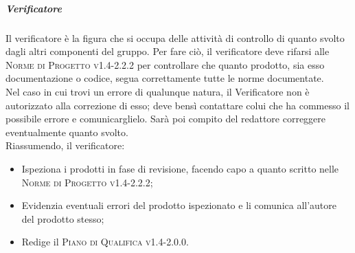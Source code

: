 \documentclass[../norme-di-progetto.tex]{subfiles}
\begin{document}
\subparagraph{Verificatore}
Il verificatore è la figura che si occupa delle attività di controllo di quanto svolto dagli altri componenti del gruppo. Per fare ciò, il verificatore deve rifarsi alle \textsc{Norme di Progetto v1.4-2.2.2} per controllare che quanto prodotto, sia esso documentazione o codice, segua correttamente tutte le norme documentate. \\
Nel caso in cui trovi un errore di qualunque natura, il Verificatore non è autorizzato alla correzione di esso; deve bensì contattare colui che ha commesso il possibile errore e comunicarglielo. Sarà poi compito del redattore correggere eventualmente quanto svolto. \\
Riassumendo, il verificatore:
\begin{itemize}
  \item Ispeziona i prodotti in fase di revisione, facendo capo a quanto scritto nelle \textsc{Norme di Progetto v1.4-2.2.2};
  \item Evidenzia eventuali errori del prodotto ispezionato e li comunica all'autore del prodotto stesso;
  \item Redige il \textsc{Piano di Qualifica v1.4-2.0.0}.
\end{itemize}
\end{document}
